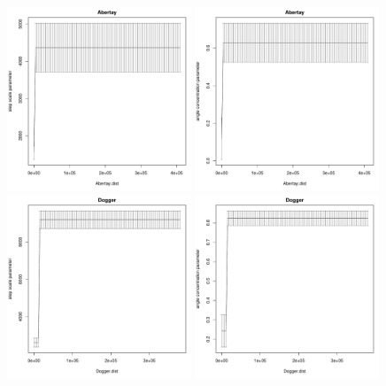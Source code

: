 \documentclass[12pt]{article}\usepackage[]{graphicx}\usepackage[]{xcolor}
\begin{document}
\begin{figure}[htbp]
  \includegraphics[width=0.49\textwidth]{plot_greySealResults002.pdf}
  \includegraphics[width=0.49\textwidth]{plot_greySealResults009.pdf}\\
  \includegraphics[width=0.49\textwidth]{plot_greySealResults006.pdf}
  \includegraphics[width=0.49\textwidth]{plot_greySealResults013.pdf}\\

\end{figure}
\end{document}
